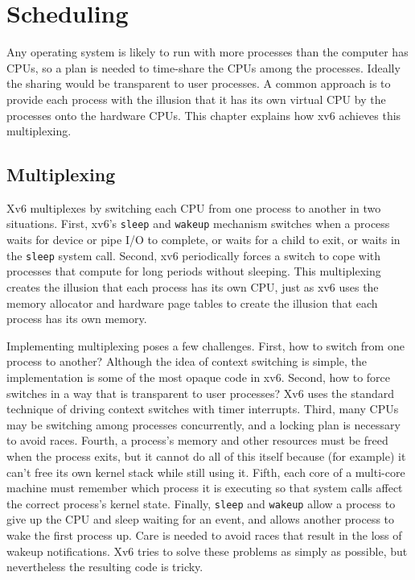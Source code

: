 % 
%  
\chapter{Scheduling}
\label{CH:SCHED}

Any operating system is likely to run with more processes than the
computer has CPUs, so a plan is needed to time-share the
CPUs among the processes. Ideally the sharing would be transparent to user
processes.  A common approach is to provide each process
with the illusion that it has its own virtual CPU by
the processes onto the hardware CPUs.
This chapter explains how xv6 achieves this multiplexing.
\section{Multiplexing}

Xv6 multiplexes by switching each CPU from one process to
another in two situations. First, xv6's
\lstinline{sleep}
and
\lstinline{wakeup}
mechanism switches when a process waits
for device or pipe I/O to complete, or waits for a child
to exit, or waits in the
\lstinline{sleep}
system call.
Second, xv6 periodically forces a switch to cope with
processes that compute for long periods without sleeping.
This multiplexing creates the illusion that
each process has its own CPU, just as xv6 uses the memory allocator and hardware
page tables to create the illusion that each process has its own memory.

Implementing multiplexing poses a few challenges. First, how to switch from one
process to another? 
Although the idea of context switching
is simple, the implementation is some of the most opaque code
in xv6. Second, how to force
switches in a way that is transparent to user processes?  Xv6 uses the
standard technique of driving context switches with timer interrupts.
Third, many CPUs may be switching among processes concurrently, and a
locking plan is necessary to avoid races. Fourth, a process's
memory and other resources must be freed when the process exits,
but it cannot do all of this itself
because (for example) it can't free its own kernel stack while still using it.
Fifth, each core of a multi-core machine must remember which
process it is executing so that system calls affect the correct
process's kernel state.
Finally,  \lstinline{sleep} and \lstinline{wakeup} allow a process to give up
the CPU and sleep waiting for an event, and allows another process to
wake the first process up. Care is needed to avoid races that result in
the loss of wakeup notifications.
Xv6 tries to solve these problems as
simply as possible, but nevertheless the resulting code is
tricky.

